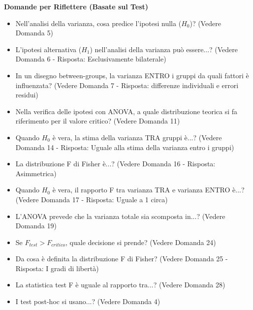\documentclass[12pt, a4paper]{article}
\newenvironment{reflectionbox}{%
    \medskip
    \begin{framed}\par\noindent
    \textbf{\color{boxtitlecolor}Domande per Riflettere (Basate sul Test)} \par
    \begin{itemize}[leftmargin=*, label=$\blacktriangleright$]
}{%
    \end{itemize}\par
    \end{framed}
    \medskip
}
\newcommand{\Fscore}{F} %
\newcommand{\Hnull}{H_0} %
\newcommand{\Halt}{H_1} %
\begin{document}
\begin{reflectionbox}
    \item Nell'analisi della varianza, cosa predice l'ipotesi nulla ($\Hnull$)? (Vedere Domanda 5)
    \item L'ipotesi alternativa ($\Halt$) nell'analisi della varianza può essere...? (Vedere Domanda 6 - Risposta: Esclusivamente bilaterale)
    \item In un disegno between-groups, la varianza ENTRO i gruppi da quali fattori è influenzata? (Vedere Domanda 7 - Risposta: differenze individuali e errori residui)
    \item Nella verifica delle ipotesi con ANOVA, a quale distribuzione teorica si fa riferimento per il valore critico? (Vedere Domanda 11)
    \item Quando $\Hnull$ è vera, la stima della varianza TRA gruppi è...? (Vedere Domanda 14 - Risposta: Uguale alla stima della varianza entro i gruppi)
    \item La distribuzione F di Fisher è...? (Vedere Domanda 16 - Risposta: Asimmetrica)
    \item Quando $\Hnull$ è vera, il rapporto F tra varianza TRA e varianza ENTRO è...? (Vedere Domanda 17 - Risposta: Uguale a 1 circa)
    \item L'ANOVA prevede che la varianza totale sia scomposta in...? (Vedere Domanda 19)
    \item Se $\Fscore_{test} > \Fscore_{critico}$, quale decisione si prende? (Vedere Domanda 24)
    \item Da cosa è definita la distribuzione F di Fisher? (Vedere Domanda 25 - Risposta: I gradi di libertà)
    \item La statistica test F è uguale al rapporto tra...? (Vedere Domanda 28)
    \item I test post-hoc si usano...? (Vedere Domanda 4)
\end{reflectionbox}
\end{document}
